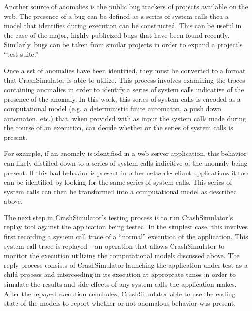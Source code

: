     Another source of anomalies is the public bug trackers of projects available on the web.  The presence of a bug can
    be defined as a series of system calls then a model that identifies during execution can be constructed.  This can
    be useful in the case of the major, highly publicized bugs that have been found recently.  Similarly, bugs can be
    taken from similar projects in order to expand a project's ``test suite.''

    Once a set of anomalies have been identified, they must be converted to a format that CrashSimulator is able to
    utilize.  This process involves examining the traces containing anomalies in order to identify a series of system
    calls indicative of the presence of the anomaly.  In this work, this series of system calls is encoded as a
    computational model (e.g. a deterministic finite automaton, a push down automaton, etc.) that, when provided with as
    input the system calls made during the course of an execution, can decide whether or the series of system calls is
    present.

    For example, if an anomaly is identified in a web server application, this behavior can likely distilled down to a
    series of system calls indicitive of the anomaly being present.  If this bad behavior is present in other
    network-reliant applications it too can be identified by looking for the same series of system calls.  This series
    of system calls can then be transformed into a computational model as described above.

    The next step in CrashSimulator's testing process is to run CrashSimulator's replay tool against the application
    being tested.  In the simplest case, this involves first recording a system call trace of a ``normal'' execution of
    the application.  This system call trace is replayed -- an operation that allows CrashSimulator to monitor the
    execution utilizing the computational models discussed above.  The reply process consists of CrashSimulator
    launching the application under test as a child process and interceeding in its execution at approprate times in
    order to simulate the results and side effects of any system calls the application makes.  After the repayed
    execution concludes, CrashSimulator able to use the ending state of the models to report whether or not anomalous
    behavior was present.

